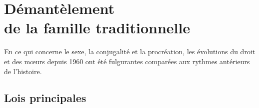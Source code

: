 

\chapter[Démantèlement de la famille traditionnelle]{Démantèlement\\de la famille traditionnelle}


 En ce qui concerne le sexe, la conjugalité et la procréation, les évolutions du droit et des mœurs depuis 1960 ont été fulgurantes comparées aux rythmes antérieurs de l'histoire.


\section{Lois principales}

